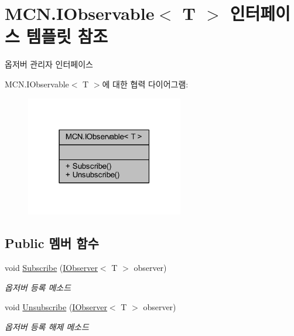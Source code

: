 \hypertarget{interface_m_c_n_1_1_i_observable}{}\section{M\+C\+N.\+I\+Observable$<$ T $>$ 인터페이스 템플릿 참조}
\label{interface_m_c_n_1_1_i_observable}


옵저버 관리자 인터페이스  




M\+C\+N.\+I\+Observable$<$ T $>$에 대한 협력 다이어그램\+:\nopagebreak
\begin{figure}[H]
\begin{center}
\leavevmode
\includegraphics[width=195pt]{interface_m_c_n_1_1_i_observable__coll__graph}
\end{center}
\end{figure}
\subsection*{Public 멤버 함수}
\begin{DoxyCompactItemize}
\item 
void \hyperlink{interface_m_c_n_1_1_i_observable_a84e57296a612a2d49afbcc7f841ceb0b}{Subscribe} (\hyperlink{interface_m_c_n_1_1_i_observer}{I\+Observer}$<$ T $>$ observer)
\begin{DoxyCompactList}\small\item\em 옵저버 등록 메소드 \end{DoxyCompactList}\item 
void \hyperlink{interface_m_c_n_1_1_i_observable_a3ff752d344f0b610b1146af7a0fbf067}{Unsubscribe} (\hyperlink{interface_m_c_n_1_1_i_observer}{I\+Observer}$<$ T $>$ observer)
\begin{DoxyCompactList}\small\item\em 옵저버 등록 해제 메소드 \end{DoxyCompactList}\end{DoxyCompactItemize}


